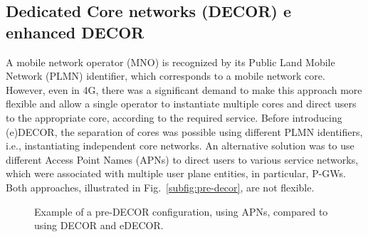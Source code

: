 \subsection*{Dedicated Core networks (DECOR) e enhanced DECOR}

A mobile network operator (MNO) is recognized by its Public Land Mobile Network (PLMN) identifier, which corresponds to a mobile network core. However, even in 4G, there was a significant demand to make this approach more flexible and allow a single operator to instantiate multiple cores and direct users to the appropriate core, according to the required service. Before introducing (e)DECOR, the separation of cores was possible using different PLMN identifiers, i.e., instantiating independent core networks. An alternative solution was to use different Access Point Names (APNs) to direct users to various service networks, which were associated with multiple user plane entities, in particular, P-GWs. Both approaches, illustrated in Fig.~\ref{subfig:pre-decor}, are not flexible.

\begin{figure}[htb]
\centering
    \hfil
    \caption{Example of a pre-DECOR configuration, using APNs, compared to using DECOR and eDECOR.}
\label{fig:decor}
\end{figure}

